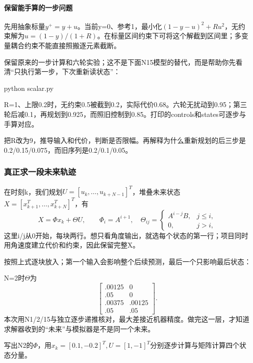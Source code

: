 \paragraph*{保留能手算的一步问题}
先用抽象标量$y^+=y+u$。当前y=0、参考1，最小化$(1-y-u)^2+Ru^2$，无约束解为$u=(1-y)/(1+R)$。在标量区间约束下可将这个解截到区间里；多变量耦合约束不能直接照搬逐元素截断。
\begin{example}
保留原来的一步计算和六轮实验；这不是下面N15模型的替代，而是帮助你先看清“只执行第一步，下次重新读状态”：

\begin{tbash}
python scalar.py
\end{tbash}
R=1、上限0.2时，无约束0.5被截到0.2，实际代价0.68。六轮无扰动到0.95；第三轮后减0.1，再规划到0.925，而照旧控制到0.85。打印的controls和states可逐步与手算对应。
\end{example}
\begin{exercise}\label{ex:v2-mpc-scalar}
把R改为9，推导输入和代价，判断是否限幅。再解释为什么重新规划的后三步是0.2/0.15/0.075，而旧序列是0.2/0.1/0.05。
\end{exercise}

\subsubsection{真正求一段未来轨迹}
在时刻k，我们规划$U=[u_k,\ldots,u_{k+N-1}]^T$，堆叠未来状态$X=[x_{k+1}^T,\ldots,x_{k+N}^T]^T$，有
\[
X=\Phi x_k+\Theta U,\qquad
\Phi_i=A^{i+1},\quad
\Theta_{ij}=\begin{cases}A^{i-j}B,&j\le i,\\0,&j>i,\end{cases}
\]
这里i/j从0开始，每块两行。想只看角度输出，就选每个状态的第一行；项目同时用角速度建立代价和约束，因此保留完整X。
\begin{example}[堆叠矩阵不是凭名字生成的]
按照上式逐块放入；第一个输入会影响整个后续预测，最后一个只影响最后状态：

N=2时$\Theta$为
\[
\begin{bmatrix}.00125&0\\.05&0\\.00375&.00125\\.05&.05\end{bmatrix}.
\]
本次用N1/2/15与独立逐步递推核对，最大差接近机器精度。做完这一层，才知道求解器收到的“未来”与模拟器是不是同一个未来。
\end{example}
\begin{exercise}\label{ex:v2-mpc-prediction}
写出N2的$\Phi$，用$x_k=[0.1,-0.2]^T,U=[1,-1]^T$分别逐步计算与矩阵计算四个状态分量。
\end{exercise}

